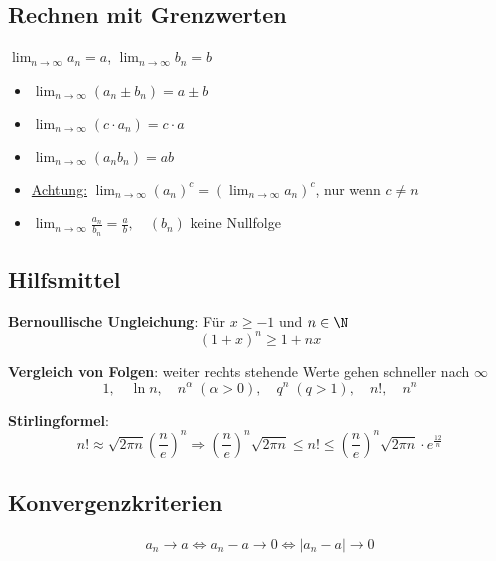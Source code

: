 \subsection{Rechnen mit Grenzwerten}
$\lim_{n \to \infty} a_n = a$, $\lim_{n \to \infty} b_n = b$
\begin{itemize}
  \item $\lim_{n \to \infty} (a_n \pm b_n) = a \pm b$
  \item $\lim_{n \to \infty} (c \cdot a_n) = c \cdot a$
  \item $\lim_{n \to \infty} (a_n b_n) = ab$
  \item \underline{Achtung:} $\lim_{n \to \infty} (a_n)^c = (\lim_{n \to
  \infty} a_n)^c$, nur wenn $c \neq n$
  \item $\lim_{n \to \infty} \frac{a_n}{b_n} = \frac{a}{b}, \quad (b_n)$ keine
  Nullfolge
\end{itemize}

\subsection{Hilfsmittel}
\textbf{Bernoullische Ungleichung}: Für $x \geq -1$ und $n \in \N$
\[
	(1+x)^n \geq 1 + nx
\]


\textbf{Vergleich von Folgen}: weiter rechts stehende Werte gehen schneller nach
$\infty$
\[
	1, \quad \ln n, \quad n^\alpha \; (\alpha > 0), \quad q^n \; (q > 1), \quad n!,
	\quad n^n
\]

\textbf{Stirlingformel}:
\[
	n! \approx \sqrt{2 \pi n} \left (\frac{n}{e} \right )^n
	\Rightarrow \left ( \frac{n}{e} \right )^n \sqrt{2 \pi n} \leq n! \leq \left (
	\frac{n}{e} \right )^n \sqrt{2 \pi n} \cdot e^\frac{12}{n}
\]

\subsection{Konvergenzkriterien}
\begin{align*}
	a_n \to a \Leftrightarrow a_n - a \to 0 \Leftrightarrow |a_n - a| \to 0
\end{align*}
	

